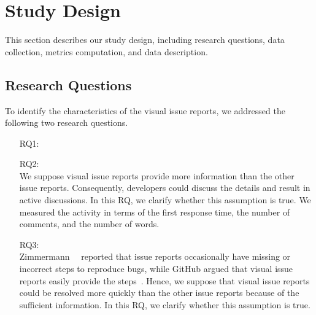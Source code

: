 \section{Study Design}
\label{sec:design}

This section describes our study design, including research questions, data collection, metrics computation, and data description.

\subsection{Research Questions}
\label{sec:rqs}

To identify the characteristics of the visual issue reports, we addressed the following two research questions. 
\begin{itemize}
	\item[RQ1:] \textbf{\RQone{}}\\
	\item[RQ2:] \textbf{\RQtwo{}}\\
	We suppose visual issue reports provide 
	more information than the other issue reports. 
	Consequently, developers could discuss the details and 
	result in active discussions. 
	In this RQ, we clarify whether this assumption is true. 
	We measured the activity in terms of 
	the first response time, 
	the number of comments, and 
	the number of words. 
	\item[RQ3:] \textbf{\RQthree{}}\\
	Zimmermann~\et~\citep{zimmermann2010TSE} reported that
	issue reports occasionally have missing or incorrect steps 
	to reproduce bugs, 
	while GitHub argued that visual issue reports easily 
	provide the steps~\citep{github-video-blog}. 
	Hence, we suppose that visual issue reports could be 
	resolved more quickly than the other issue reports 
	because of the sufficient information. 
	In this RQ, we clarify whether this assumption is true. 
\end{itemize}

